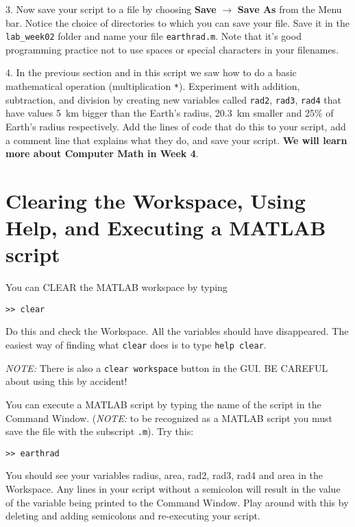 \documentclass[letterpaper]{article}
\begin{document}
3.  Now save your script to a file by choosing  {\bf Save} $\rightarrow$ {\bf Save As} from the Menu bar.  Notice the choice of directories to which
you can save your file.  Save it in the \verb+lab_week02+ folder and name your file \verb+earthrad.m+.  Note that it's good programming practice not to use spaces or special characters in your filenames.

4.  In the previous section and in this script we saw
how to do a basic mathematical operation (multiplication \verb+*+).  Experiment with addition, subtraction, and division by creating
new variables called \verb+rad2+, \verb+rad3+, \verb+rad4+ that have values 5~km bigger than the Earth's radius, 20.3~km smaller and 25\% of Earth's radius respectively.
Add the lines of code that do this to your script, add a comment line that explains what they do, and save your script.
{\bf We will learn more about Computer Math in Week 4}.



\section {Clearing the Workspace, Using Help, and Executing a MATLAB script}


You can CLEAR the MATLAB workspace by typing
\begin{verbatim}
>> clear
\end{verbatim}

Do this and check the Workspace.  All the variables should have disappeared.
The easiest way of finding what \verb+clear+ does is to
type \verb+help clear+.

{\it NOTE:} There is also a \verb+clear workspace+ button in the GUI.  BE CAREFUL about using this by accident!

You can execute a MATLAB script by typing the name of the script in the Command Window.
({\it NOTE:} to be recognized as a MATLAB script you must save the file with the
subscript \verb+.m+).  Try this:

\begin{verbatim}
>> earthrad
\end{verbatim}

You should see your variables radius, area, rad2, rad3, rad4 and area in the Workspace.
Any lines in your script without a semicolon will result in the value of the variable being
printed to the Command Window.  Play around with this by deleting and adding semicolons
and re-executing your script.
\end{document}
